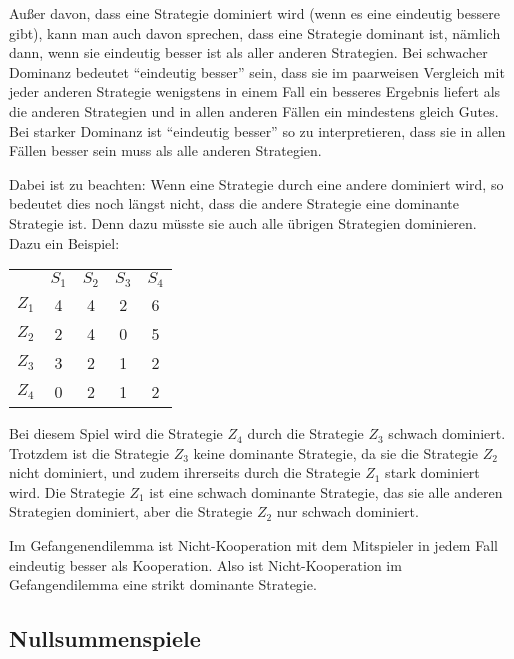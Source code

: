 Außer davon, dass eine Strategie dominiert wird (wenn es eine eindeutig bessere
gibt), kann man auch davon sprechen, dass eine Strategie dominant ist, nämlich
dann, wenn sie eindeutig besser ist als aller anderen Strategien. Bei schwacher
Dominanz bedeutet "`eindeutig besser"' sein, dass sie im paarweisen Vergleich
mit jeder anderen Strategie wenigstens in einem Fall ein besseres Ergebnis
liefert als die anderen Strategien und in allen anderen Fällen ein mindestens
gleich Gutes. Bei starker Dominanz ist "`eindeutig besser"' so zu interpretieren,
dass sie in allen Fällen besser sein muss als alle anderen Strategien. 

Dabei ist zu beachten: Wenn eine Strategie durch eine andere dominiert wird, so
bedeutet dies noch längst nicht, dass die andere Strategie eine dominante
Strategie ist. Denn dazu müsste sie auch alle übrigen Strategien dominieren.
Dazu ein Beispiel:

\begin{center}
\begin{tabular}{c|c|c|c|c|}
\multicolumn{1}{c}{} & 
\multicolumn{1}{c}{$S_1$} &
\multicolumn{1}{c}{$S_2$} &
\multicolumn{1}{c}{$S_3$} &
\multicolumn{1}{c}{$S_4$} \\ \cline{2-5}

$Z_1$ & 4 & 4 & 2 & 6  \\ \cline{2-5}
$Z_2$ & 2 & 4 & 0 & 5 \\ \cline{2-5}
$Z_3$ & 3 & 2 & 1 & 2 \\ \cline{2-5}
$Z_4$ & 0 & 2 & 1 & 2 \\ \cline{2-5}

\end{tabular}
\end{center}

Bei diesem Spiel wird die Strategie $Z_4$ durch die Strategie $Z_3$ schwach
dominiert. Trotzdem ist die Strategie $Z_3$ keine dominante Strategie, da sie
die Strategie $Z_2$ nicht dominiert, und zudem ihrerseits durch die Strategie
$Z_1$ stark dominiert wird. Die Strategie $Z_1$ ist eine schwach dominante
Strategie, das sie alle anderen Strategien dominiert, aber die Strategie $Z_2$
nur schwach dominiert.

Im Gefangenendilemma ist Nicht-Kooperation mit dem Mitspieler in jedem Fall
eindeutig besser als Kooperation. Also ist Nicht-Kooperation im
Gefangendilemma eine strikt dominante Strategie.

\subsection{Nullsummenspiele}

